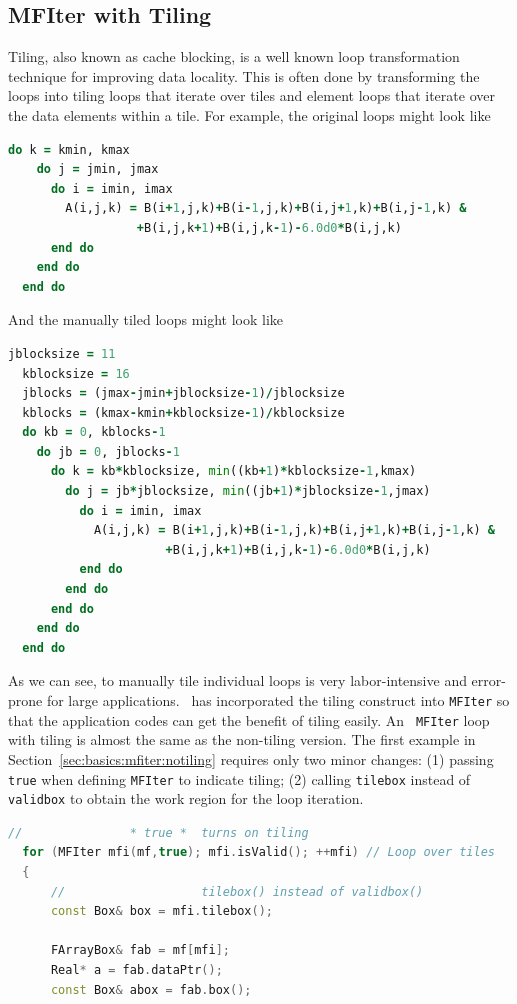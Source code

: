 {{\subsection{MFIter with Tiling}
\label{sec:basics:mfiter:tiling}

Tiling, also known as cache blocking, is a well known loop
transformation technique for improving data locality.  This is often
done by transforming the loops into tiling loops that iterate over
tiles and element loops that iterate over the data elements within a
tile.  For example, the original loops might look like
\begin{lstlisting}[language=fortran]
  do k = kmin, kmax
    do j = jmin, jmax
      do i = imin, imax
        A(i,j,k) = B(i+1,j,k)+B(i-1,j,k)+B(i,j+1,k)+B(i,j-1,k) &
                  +B(i,j,k+1)+B(i,j,k-1)-6.0d0*B(i,j,k)
      end do
    end do
  end do
\end{lstlisting}
And the manually tiled loops might look like
\begin{lstlisting}[language=fortran]
  jblocksize = 11
  kblocksize = 16
  jblocks = (jmax-jmin+jblocksize-1)/jblocksize
  kblocks = (kmax-kmin+kblocksize-1)/kblocksize
  do kb = 0, kblocks-1
    do jb = 0, jblocks-1
      do k = kb*kblocksize, min((kb+1)*kblocksize-1,kmax)
        do j = jb*jblocksize, min((jb+1)*jblocksize-1,jmax)
          do i = imin, imax
            A(i,j,k) = B(i+1,j,k)+B(i-1,j,k)+B(i,j+1,k)+B(i,j-1,k) &
                      +B(i,j,k+1)+B(i,j,k-1)-6.0d0*B(i,j,k)
          end do
        end do
      end do
    end do
  end do
\end{lstlisting}
As we can see, to manually tile individual loops is very
labor-intensive and error-prone for large applications.  \amrex\ has
incorporated the tiling construct into {\tt MFIter} so that the
application codes can get the benefit of tiling easily.  An {\tt
  MFIter} loop with tiling is almost the same as the non-tiling
version.  The first example in
Section~\ref{sec:basics:mfiter:notiling} requires only two minor
changes: (1) passing {\tt true} when defining {\tt MFIter} to indicate
tiling; (2) calling {\tt tilebox} instead of {\tt validbox} to obtain
the work region for the loop iteration.
\begin{lstlisting}[language=cpp]
  //               * true *  turns on tiling
  for (MFIter mfi(mf,true); mfi.isValid(); ++mfi) // Loop over tiles
  {
      //                   tilebox() instead of validbox()
      const Box& box = mfi.tilebox();

      FArrayBox& fab = mf[mfi];
      Real* a = fab.dataPtr();
      const Box& abox = fab.box();


\end{lstlisting}}}

